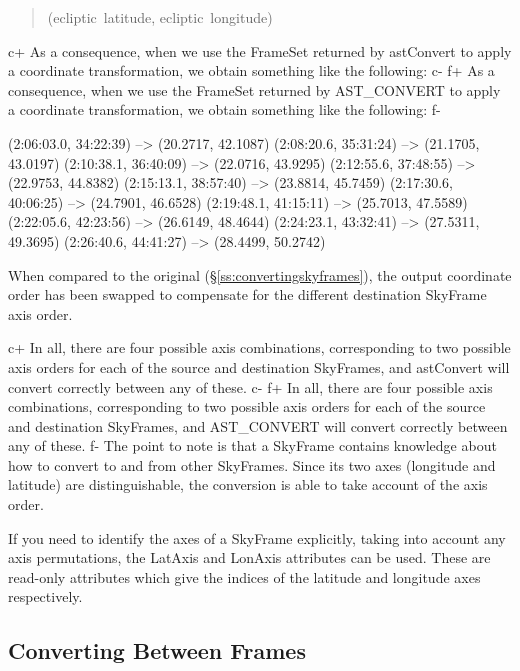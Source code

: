 \documentclass[twoside,11pt]{starlink}
\providecommand{\secref}[1]{\S\ref{#1}}
\begin{document}
\begin{quote}
(ecliptic~latitude, ecliptic~longitude)
\end{quote}

c+
As a consequence, when we use the FrameSet returned by astConvert to
apply a coordinate transformation, we obtain something like the
following:
c-
f+
As a consequence, when we use the FrameSet returned by AST\_CONVERT to
apply a coordinate transformation, we obtain something like the
following:
f-

\begin{terminalv}
(2:06:03.0, 34:22:39) --> (20.2717, 42.1087)
(2:08:20.6, 35:31:24) --> (21.1705, 43.0197)
(2:10:38.1, 36:40:09) --> (22.0716, 43.9295)
(2:12:55.6, 37:48:55) --> (22.9753, 44.8382)
(2:15:13.1, 38:57:40) --> (23.8814, 45.7459)
(2:17:30.6, 40:06:25) --> (24.7901, 46.6528)
(2:19:48.1, 41:15:11) --> (25.7013, 47.5589)
(2:22:05.6, 42:23:56) --> (26.6149, 48.4644)
(2:24:23.1, 43:32:41) --> (27.5311, 49.3695)
(2:26:40.6, 44:41:27) --> (28.4499, 50.2742)
\end{terminalv}

When compared to the original (\secref{ss:convertingskyframes}), the
output coordinate order has been swapped to compensate for the
different destination SkyFrame axis order.

c+
In all, there are four possible axis combinations, corresponding to two
possible axis orders for each of the source and destination SkyFrames,
and astConvert will convert correctly between any of these.
c-
f+
In all, there are four possible axis combinations, corresponding to two
possible axis orders for each of the source and destination SkyFrames,
and AST\_CONVERT will convert correctly between any of these.
f-
The point to note is that a SkyFrame contains knowledge about how to
convert to and from other SkyFrames. Since its two axes (longitude and
latitude) are distinguishable, the conversion is able to take account
of the axis order.

If you need to identify the axes of a SkyFrame explicitly, taking into
account any axis permutations, the LatAxis and LonAxis attributes can be
used. These are read-only attributes which give the indices of the
latitude and longitude axes respectively.

\subsection{\label{ss:convertingframes}Converting Between Frames}
\end{document}
